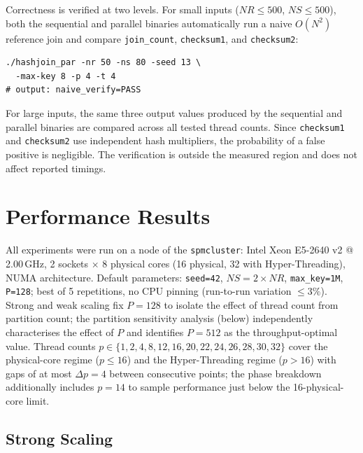 \documentclass[10pt,a4paper,twocolumn]{article}
\begin{document}
Correctness is verified at two levels. For small inputs ($NR \leq 500$, $NS \leq 500$), both the sequential and parallel binaries automatically run a naive $O(N^2)$ reference join and compare \texttt{join\_count}, \texttt{checksum1}, and \texttt{checksum2}:

\begin{lstlisting}
./hashjoin_par -nr 50 -ns 80 -seed 13 \
  -max-key 8 -p 4 -t 4
# output: naive_verify=PASS
\end{lstlisting}

For large inputs, the same three output values produced by the sequential and parallel binaries are compared across all tested thread counts. Since \texttt{checksum1} and \texttt{checksum2} use independent hash multipliers, the probability of a false positive is negligible. The verification is outside the measured region and does not affect reported timings.

\section{Performance Results}
\label{sec:results}

All experiments were run on a node of the \texttt{spmcluster}: Intel Xeon E5-2640 v2 @ 2.00\,GHz, 2 sockets $\times$ 8 physical cores (16 physical, 32 with Hyper-Threading), NUMA architecture. Default parameters: \texttt{seed=42}, $NS=2\times NR$, \texttt{max\_key=1M}, \texttt{P=128}; best of 5 repetitions, no CPU pinning (run-to-run variation $\leq 3\%$). Strong and weak scaling fix $P=128$ to isolate the effect of thread count from partition count; the partition sensitivity analysis (below) independently characterises the effect of $P$ and identifies $P=512$ as the throughput-optimal value. Thread counts $p\in\{1,2,4,8,12,16,20,22,24,26,28,30,32\}$ cover the physical-core regime ($p\leq 16$) and the Hyper-Threading regime ($p>16$) with gaps of at most $\Delta p=4$ between consecutive points; the phase breakdown additionally includes $p=14$ to sample performance just below the 16-physical-core limit.

\subsection*{Strong Scaling}
\end{document}
